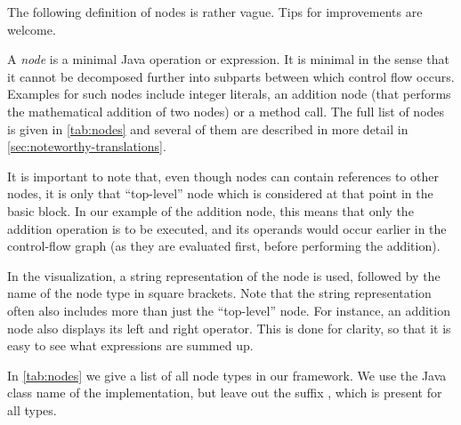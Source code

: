\begin{workinprogress}
    The following definition of nodes is rather vague. Tips for improvements are welcome.
\end{workinprogress}
\begin{definition}[Nodes]
    \label{def:node}
    A \emph{node} is a minimal Java operation or expression.
    It is minimal in the sense that it cannot be decomposed further into subparts
    between which control flow occurs. Examples for such nodes include integer literals,
    an addition node (that performs the mathematical addition of two nodes) or a method call.
    The full list of nodes is given in \autoref{tab:nodes} and several of them
    are described in more detail in \autoref{sec:noteworthy-translations}.
    
    It is important to note that, even though nodes can contain references to other nodes,
    it is only that ``top-level'' node which is considered at that point in the basic
    block. In our example of the addition node, this means that only the addition operation
    is to be executed, and its operands would occur earlier in the control-flow graph
    (as they are evaluated first, before performing the addition).
\end{definition}

In the visualization, a string representation of the node is used, followed by the name
of the node type in square brackets. Note that the string representation often also includes
more than just the ``top-level'' node. For instance, an addition node also displays its
left and right operator. This is done for clarity, so that it is easy to see what
expressions are summed up.

In \autoref{tab:nodes} we give a list of all node types in our framework. We use the
Java class name of the implementation, but leave out the suffix , which is present
for all types.

